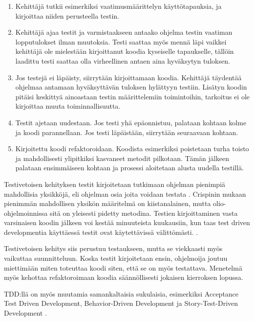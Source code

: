 \documentclass[finnish]{tktltiki2}
\theoremstyle{definition}
\theoremstyle{remark}
\begin{document}
\begin{enumerate}
  \item Kehittäjä tutkii esimerkiksi vaatimusmäärittelyn käyttötapauksia, ja kirjoittaa niiden perusteella testin.

  \item Kehittäjä ajaa testit ja varmistaakseen antaako ohjelma testin vaatiman lopputulokset ilman muutoksia. Testi saattaa myös mennä läpi vaikkei kehittäjä ole mielestään kirjoittanut koodia kyseiselle tapaukselle, tällöin laadittu testi saattaa olla virheellinen antaen aina hyväksytyn tuloksen.

  \item Jos testejä ei läpäisty, siirrytään kirjoittamaan koodia. Kehittäjä täydentää ohjelmaa antamaan hyväksyttävän tuloksen hylättyyn testiin. Lisätyn koodin pitäisi keskittyä ainoastaan testin määrittelemiin toimintoihin, tarkoitus ei ole kirjoittaa muuta toiminnallisuutta.

 \item Testit ajetaan uudestaan. Jos testi yhä epäonnistuu, palataan kohtaan kolme ja koodi parannellaan. Jos testi läpäistään, siirrytään seuraavaan kohtaan.

 \item Kirjoitettu koodi refaktoroidaan. Koodista esimerkiksi poistetaan turha toisto ja mahdollisesti ylipitkiksi kasvaneet metodit pilkotaan. Tämän jälkeen palataan ensimmäiseen kohtaan ja prosessi aloitetaan alusta uudella testillä.



\end{enumerate}

Testivetoisen kehityksen testit kirjoitetaan tutkimaan ohjelman pienimpiä mahdollisia yksikköjä, eli ohjelman osia joita voidaan testata \cite{Crispin06}. Crispinin mukaan pienimmän mahdollisen yksikön määritelmä on kiistanalainen, mutta olio-ohjelmoinnissa sitä on yleisesti pidetty metodina. Testien kirjoittaminen vasta varsinaisen koodin jälkeen voi kestää minuuteista kuukausiin, kun taas test driven developmentia käyttäessä testit ovat käytettävissä välittömästi. \cite{Janzen05}. 

Testivetoisen kehitys siis perustuu testaukseen, mutta se viekkaasti myös vaikuttaa suunnitteluun. Koska testit kirjoitetaan ensin, ohjelmoija joutuu miettimään miten toteuttaa koodi siten, että se on myös testattava. Menetelmä myös  kehottaa refaktoroimaan koodia säännöllisesti jokaisen kierroksen lopussa.

TDD:llä on myös muutamia samankaltaisia sukulaisia, esimerkiksi 
Acceptance Test Driven Development, Behavior-Driven Development ja Story-Test-Driven Development \cite{Turhan10}.
\end{document}

